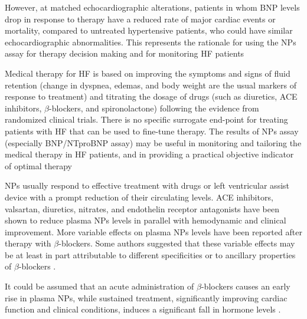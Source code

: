 \documentclass[14pt,a4paper,onecolumn]{extarticle}
\begin{document}
However, at matched echocardiographic alterations, patients in whom BNP levels drop in response to therapy have a reduced rate of major cardiac events or mortality, compared to untreated hypertensive patients, who could have similar echocardiographic abnormalities. This represents the rationale for using the NPs assay for therapy decision making and for monitoring HF patients \citep{bib35}%

Medical therapy for HF is based on improving the symptoms and signs of fluid retention (change in dyspnea, edemas, and body weight are the usual markers of response to treatment) and titrating the dosage of drugs (such as diuretics, ACE inhibitors, $\beta$-blockers, and spironolactone) following the evidence from randomized clinical trials. There is no specific surrogate end-point for treating patients with HF that can be used to fine-tune therapy.  The results of NPs assay (especially BNP/NTproBNP assay) may be useful in monitoring and tailoring the medical therapy in HF patients, and in providing a practical objective indicator of optimal therapy \citep{bib365}%

NPs usually respond to effective treatment with drugs or left ventricular assist device with a prompt reduction of their circulating levels.  ACE inhibitors, valsartan, diuretics, nitrates, and endothelin receptor antagonists have been shown to reduce plasma NPs levels in parallel with hemodynamic and clinical improvement.  More variable effects on plasma NPs levels have been reported after therapy with $\beta$-blockers. Some authors suggested that these variable effects may be at least in part attributable to different specificities or to ancillary properties of $\beta$-blockers \citep{bib362}.

It could be assumed that an acute administration of $\beta$-blockers causes an early rise in plasma NPs, while sustained treatment, significantly improving cardiac function and clinical conditions, induces a significant fall in hormone levels \citep{bib390}.


\end{document}
